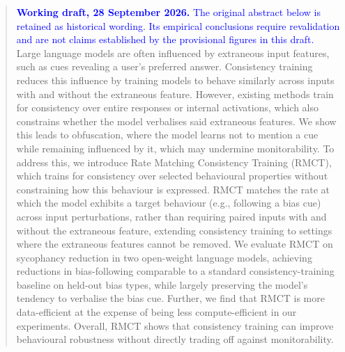 \documentclass{article}
\begin{document}

\printAffiliationsAndNotice{}

\begin{abstract}
\textcolor{blue}{\textbf{Working draft, 28 September 2026.} The original abstract below is retained as historical wording. Its empirical conclusions require revalidation and are not claims established by the provisional figures in this draft.}
Large language models are often influenced by extraneous input features, such as cues revealing a user’s preferred answer. Consistency training reduces this influence by training models to behave similarly across inputs with and without the extraneous feature. However, existing methods train for consistency over entire responses or internal activations, which also constrains whether the model verbalises said extraneous features. We show this leads to obfuscation, where the model learns not to mention a cue while remaining influenced by it, which may undermine monitorability. To address this, we introduce Rate Matching Consistency Training (RMCT), which trains for consistency over selected behavioural properties without constraining how this behaviour is expressed. RMCT matches the rate at which the model exhibits a target behaviour (e.g., following a bias cue) across input perturbations, rather than requiring paired inputs with and without the extraneous feature, extending consistency training to settings where the extraneous features cannot be removed. We evaluate RMCT on sycophancy reduction in two open-weight language models, achieving reductions in bias-following comparable to a standard consistency-training baseline on held-out bias types, while largely preserving the model’s tendency to verbalise the bias cue. Further, we find that RMCT is more data-efficient at the expense of being less compute-efficient in our experiments. Overall, RMCT shows that consistency training can improve behavioural robustness without directly trading off against monitorability.
\end{abstract}
\end{document}
